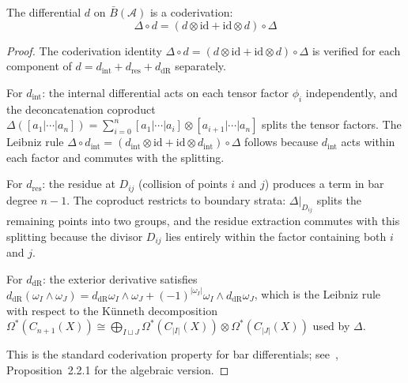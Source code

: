 \begin{theorem}\label{thm:diff-is-coderivation}
The differential $d$ on $\bar{B}(\mathcal{A})$ is a coderivation:
\[\Delta \circ d = (d \otimes \text{id} + \text{id} \otimes d) \circ \Delta\]
\end{theorem}

\begin{proof}
The coderivation identity $\Delta \circ d = (d \otimes \mathrm{id} + \mathrm{id} \otimes d) \circ \Delta$ is verified for each component of $d = d_{\mathrm{int}} + d_{\mathrm{res}} + d_{\mathrm{dR}}$ separately.

For $d_{\mathrm{int}}$: the internal differential acts on each tensor factor $\phi_i$ independently, and the deconcatenation coproduct $\Delta([a_1|\cdots|a_n]) = \sum_{i=0}^{n}[a_1|\cdots|a_i] \otimes [a_{i+1}|\cdots|a_n]$ splits the tensor factors.  The Leibniz rule $\Delta \circ d_{\mathrm{int}} = (d_{\mathrm{int}} \otimes \mathrm{id} + \mathrm{id} \otimes d_{\mathrm{int}}) \circ \Delta$ follows because $d_{\mathrm{int}}$ acts within each factor and commutes with the splitting.

For $d_{\mathrm{res}}$: the residue at $D_{ij}$ (collision of points $i$ and $j$) produces a term in bar degree $n-1$.  The coproduct restricts to boundary strata: $\Delta|_{D_{ij}}$ splits the remaining points into two groups, and the residue extraction commutes with this splitting because the divisor $D_{ij}$ lies entirely within the factor containing both $i$ and $j$.

For $d_{\mathrm{dR}}$: the exterior derivative satisfies $d_{\mathrm{dR}}(\omega_I \wedge \omega_J) = d_{\mathrm{dR}}\omega_I \wedge \omega_J + (-1)^{|\omega_I|}\omega_I \wedge d_{\mathrm{dR}}\omega_J$, which is the Leibniz rule with respect to the K\"unneth decomposition $\Omega^*(C_{n+1}(X)) \cong \bigoplus_{I \sqcup J} \Omega^*(C_{|I|}(X)) \otimes \Omega^*(C_{|J|}(X))$ used by $\Delta$.

This is the standard coderivation property for bar differentials; see~\cite{LV12}, Proposition~2.2.1 for the algebraic version.
\end{proof}

